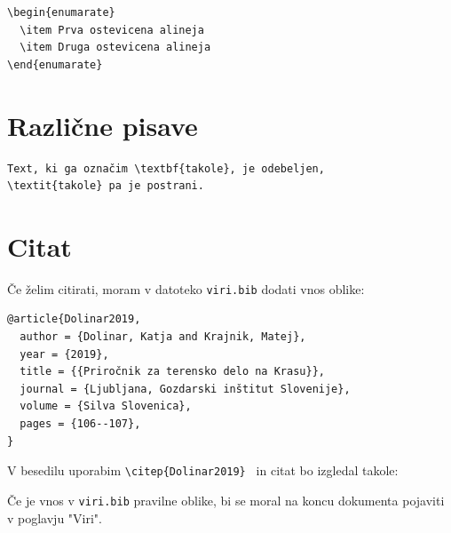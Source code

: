 \documentclass[a4paper, 12pt]{report}
\begin{document}
\begin{verbatim}
\begin{enumarate}
  \item Prva ostevicena alineja
  \item Druga ostevicena alineja
\end{enumarate}
\end{verbatim}

\section{Različne pisave}
 
\begin{verbatim}
Text, ki ga označim \textbf{takole}, je odebeljen, 
\textit{takole} pa je postrani.
\end{verbatim}

\newpage

\section{Citat}

Če želim citirati, moram v datoteko \texttt{viri.bib} dodati vnos oblike:

\begin{verbatim}
@article{Dolinar2019,
  author = {Dolinar, Katja and Krajnik, Matej},
  year = {2019},
  title = {{Priročnik za terensko delo na Krasu}},
  journal = {Ljubljana, Gozdarski inštitut Slovenije},
  volume = {Silva Slovenica},
  pages = {106--107},
}  
\end{verbatim}

V besedilu uporabim \texttt{\textbackslash citep\{Dolinar2019\} } in citat bo izgledal takole: \citep{Dolinar2019}

Če je vnos v \texttt{viri.bib} pravilne oblike, bi se moral na koncu dokumenta pojaviti v poglavju "Viri".



\end{document}
